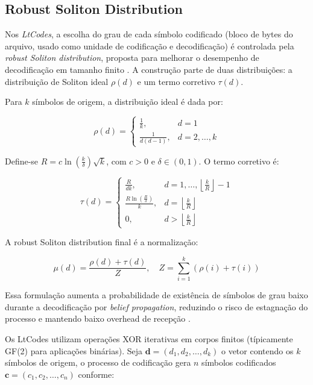 \subsection{Robust Soliton Distribution}

Nos \emph{LtCodes}, a escolha do grau de cada símbolo codificado (bloco de bytes do arquivo, usado como unidade de codificação e decodificação) é controlada pela \emph{robust Soliton distribution}, proposta para melhorar o desempenho de decodificação em tamanho finito \cite{luby2002lt,karp2004finite}. A construção parte de duas distribuições: a distribuição de Soliton ideal $\rho(d)$ e um termo corretivo $\tau(d)$.

Para $k$ símbolos de origem, a distribuição ideal é dada por:

\begin{equation}
\rho(d) = \begin{cases}
\frac{1}{k}, & d=1 \\
\frac{1}{d(d-1)}, & d=2,\ldots,k
\end{cases}
\end{equation}

Define-se $R = c\ln\left(\frac{k}{\delta}\right)\sqrt{k}$, com $c>0$ e $\delta \in (0,1)$. O termo corretivo é:

\begin{equation}
\tau(d) = \begin{cases}
\frac{R}{dk}, & d=1,\ldots,\left\lfloor\frac{k}{R}\right\rfloor-1 \\
\frac{R\ln\left(\frac{R}{\delta}\right)}{k}, & d=\left\lfloor\frac{k}{R}\right\rfloor \\
0, & d>\left\lfloor\frac{k}{R}\right\rfloor
\end{cases}
\end{equation}

A robust Soliton distribution final é a normalização:

\begin{equation}
\mu(d) = \frac{\rho(d)+\tau(d)}{Z}, \quad Z = \sum_{i=1}^{k} \left(\rho(i)+\tau(i)\right)
\end{equation}

Essa formulação aumenta a probabilidade de existência de símbolos de grau baixo durante a decodificação por \emph{belief propagation}, reduzindo o risco de estagnação do processo e mantendo baixo overhead de recepção \cite{luby2002lt,hyytia2007analysis}.

Os LtCodes utilizam operações XOR iterativas em corpos finitos (típicamente GF(2) para aplicações binárias). Seja $\mathbf{d} = (d_1, d_2, \ldots, d_k)$ o vetor contendo os $k$ símbolos de origem, o processo de codificação gera $n$ símbolos codificados $\mathbf{c} = (c_1, c_2, \ldots, c_n)$ conforme:

